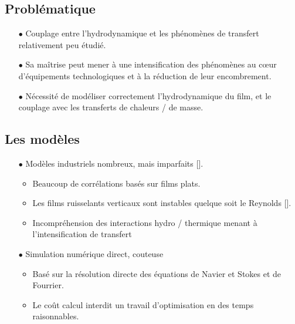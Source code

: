 \documentclass[a0,portrait]{a0poster}
\begin{document}
\begin{multicols}{2}
    \section*{Problématique}
    \begin{itemize}
    	\item[$\bullet$] Couplage entre l'hydrodynamique et les phénomènes de transfert relativement peu étudié.
    	\item[$\bullet$] Sa maîtrise peut mener à une intensification des phénomènes au cœur d'équipements technologiques et à la réduction de leur encombrement.
    	\item[$\bullet$] Nécessité de modéliser correctement l'hydrodynamique du film, et le couplage avec les transferts de chaleurs / de masse.
    \end{itemize}

    \subsection*{Les modèles}
    \begin{itemize}
	    \item[$\bullet$] Modèles industriels nombreux, mais imparfaits [\cite{Killion2001}].
    	\begin{itemize}
    		\item Beaucoup de corrélations basés sur films plats.
    		\item Les films ruisselants verticaux sont instables quelque soit le Reynolds [\textcite{Miller1998a}].
    		\item Incompréhension des interactions hydro / thermique menant à l'intensification de transfert
    	\end{itemize}
	    \item[$\bullet$] Simulation numérique direct, couteuse
    	\begin{itemize}
    		\item Basé sur la résolution directe des équations de Navier et Stokes et de Fourrier.
    		\item Le coût calcul interdit un travail d'optimisation en des temps raisonnables.
    	\end{itemize}
        \color{DarkRed}{
	    \item[$\bullet$] Modèles asymptotiques (méthode retenue)
    	\begin{itemize}
    		\item Basé un développement en couche limite adapté aux films ruisselants
    		\item Limité à un domaine de paramètres restreints (faible Reynolds et Peclet).
    		\item Travail important sur les équations en amont.
    	\end{itemize}
        }
    \end{itemize}
\end{multicols}
\end{document}
